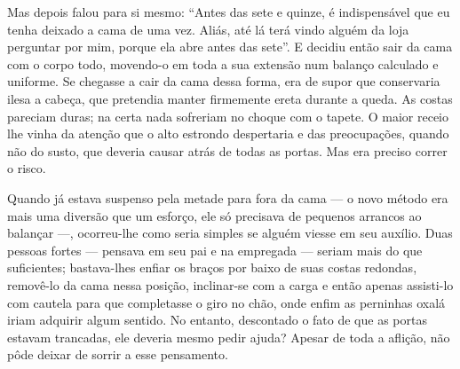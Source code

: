 Mas depois falou para si mesmo: “Antes das sete e quinze, é indispensável
que eu tenha deixado a cama de uma vez. Aliás, até lá terá vindo alguém da
loja perguntar por mim, porque ela abre antes das sete”. E decidiu então
sair da cama com o corpo todo, movendo-o em toda a sua extensão num
balanço calculado e uniforme. Se chegasse a cair da cama dessa forma, era
de supor que conservaria ilesa a cabeça, que pretendia manter firmemente
ereta durante a queda. As costas pareciam duras; na certa nada sofreriam
no choque com o tapete. O maior receio lhe vinha da atenção que o alto
estrondo despertaria e das preocupações, quando não do susto, que deveria
causar atrás de todas as portas. Mas era preciso correr o risco.

Quando já estava suspenso pela metade para fora da cama --- o novo método
era mais uma diversão que um esforço, ele só precisava de pequenos
arrancos ao balançar ---, ocorreu-lhe como seria simples se alguém viesse em
seu auxílio. Duas pessoas fortes --- pensava em seu pai e na empregada ---
seriam mais do que suficientes; bastava-lhes enfiar os braços por baixo de
suas costas redondas, removê-lo da cama nessa posição, inclinar-se com a
carga e então apenas assisti-lo com cautela para que completasse o giro no
chão, onde enfim as perninhas oxalá iriam adquirir algum sentido. No
entanto, descontado o fato de que as portas estavam trancadas, ele deveria
mesmo pedir ajuda? Apesar de toda a aflição, não pôde deixar de sorrir a
esse pensamento.

